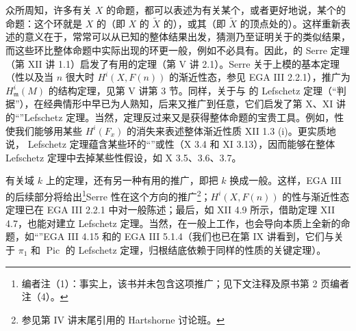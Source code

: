 众所周知，许多有关 $X$ 的命题，都可以表述为有关某个，或者更好地说，某个的命题：这个环就是 $X$ 的（即 $X$ 的 $\widetilde X$ 的），或其（即 $\widetilde X$ 的顶点处的）。这样重新表述的意义在于，常常可以从已知的整体结果出发，猜测乃至证明关于的类似结果，而这些环比整体命题中实际出现的环更一般，例如不必具有。因此，的 Serre 定理（第 XII 讲 1.1）启发了有用的定理（第 V 讲 2.1）。Serre 关于上模的基本定理（性以及当 $n$ 很大时 $H^i(X,F(n))$ 的渐近性态，参见 EGA III 2.2.1），推广为 $H^i_{\mathfrak m}(M)$ 的结构定理，见第 V 讲第 3 节。同样，关于与 的 Lefschetz 定理（“判据”），在经典情形中早已为人熟知，后来又推广到任意，它们启发了第 X、XI 讲的“”Lefschetz 定理。当然，定理反过来又是获得整体命题的宝贵工具。例如，性使我们能够用某些 $H^i(F_x)$ 的消失来表述整体渐近性质 XII 1.3 (i)。更实质地说， Lefschetz 定理蕴含某些环的“”或性（X 3.4 和 XI 3.13），因而能够在整体 Lefschetz 定理中去掉某些性假设，如 X 3.5、3.6、3.7。

有关域 $k$ 上的定理，还有另一种有用的推广，即把 $k$ 换成一般。这样，EGA III 的后续部分将给出\footnote{编者注（1）：事实上，该书并未包含这项推广；见下文注释及原书第 2 页编者注（4）。}Serre 性在这个方向的推广\footnote{参见第 IV 讲末尾引用的 Hartshorne 讨论班。}；$H^i(X,F(n))$ 的性与渐近性态定理已在 EGA III 2.2.1 中对一般陈述；最后，如 XII 4.9 所示，借助定理 XII 4.7，也能对建立 Lefschetz 定理。当然，在一般上工作，也会导向本质上全新的命题，如“”EGA III 4.15 和的 EGA III 5.1.4（我们也已在第 IX 讲看到，它们与关于 $\pi_1$ 和 $\operatorname{Pic}$ 的 Lefschetz 定理，归根结底依赖于同样的性质的关键定理）。

